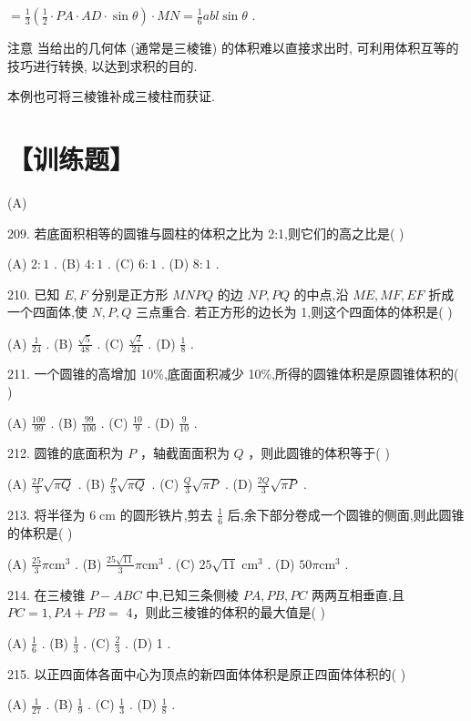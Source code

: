 \documentclass[10pt]{article}
\begin{document}
\(= \frac{1}{3}\left( {\frac{1}{2} \cdot  {PA} \cdot  {AD} \cdot  \sin \theta }\right)  \cdot  {MN} = \frac{1}{6}{abl}\sin \theta\) .

注意 当给出的几何体 (通常是三棱锥) 的体积难以直接求出时, 可利用体积互等的技巧进行转换, 以达到求积的目的.

本例也可将三棱锥补成三棱柱而获证.

\section*{【训练题】}

(A)

209. 若底面积相等的圆锥与圆柱的体积之比为 2:1,则它们的高之比是( )

(A) \(2 : 1\) . (B) \(4 : 1\) . (C) \(6 : 1\) . (D) \(8 : 1\) .

210. 已知 \(E,F\) 分别是正方形 \({MNPQ}\) 的边 \({NP},{PQ}\) 的中点,沿 \({ME},{MF},{EF}\) 折成一个四面体,使 \(N,P,Q\) 三点重合. 若正方形的边长为 1,则这个四面体的体积是( )

(A) \(\frac{1}{24}\) . (B) \(\frac{\sqrt{5}}{48}\) . (C) \(\frac{\sqrt{2}}{24}\) . (D) \(\frac{1}{8}\) .

211. 一个圆锥的高增加 10\%,底面面积减少 10\%,所得的圆锥体积是原圆锥体积的( )

(A) \(\frac{100}{99}\) . (B) \(\frac{99}{100}\) . (C) \(\frac{10}{9}\) . (D) \(\frac{9}{10}\) .

212. 圆锥的底面积为 \(P\) ，轴截面面积为 \(Q\) ，则此圆锥的体积等于( )

(A) \(\frac{2P}{3}\sqrt{\pi Q}\) . (B) \(\frac{P}{3}\sqrt{\pi Q}\) . (C) \(\frac{Q}{3}\sqrt{\pi P}\) . (D) \(\frac{2Q}{3}\sqrt{\pi P}\) .

213. 将半径为 \(6\mathrm{\;{cm}}\) 的圆形铁片,剪去 \(\frac{1}{6}\) 后,余下部分卷成一个圆锥的侧面,则此圆锥的体积是( )

(A) \(\frac{25}{3}\pi {\mathrm{{cm}}}^{3}\) . (B) \(\frac{{25}\sqrt{11}}{3}\pi {\mathrm{{cm}}}^{3}\) . (C) \({25}\sqrt{11}{\mathrm{\;{cm}}}^{3}\) . (D) \({50\pi }{\mathrm{{cm}}}^{3}\) .

214. 在三棱锥 \(P - {ABC}\) 中,已知三条侧棱 \({PA},{PB},{PC}\) 两两互相垂直,且 \({PC} = 1,{PA} + {PB} =\) 4，则此三棱锥的体积的最大值是( )

(A) \(\frac{1}{6}\) . (B) \(\frac{1}{3}\) . (C) \(\frac{2}{3}\) . (D) 1 .

215. 以正四面体各面中心为顶点的新四面体体积是原正四面体体积的( )

(A) \(\frac{1}{27}\) . (B) \(\frac{1}{9}\) . (C) \(\frac{1}{3}\) . (D) \(\frac{1}{8}\) .
\end{document}
